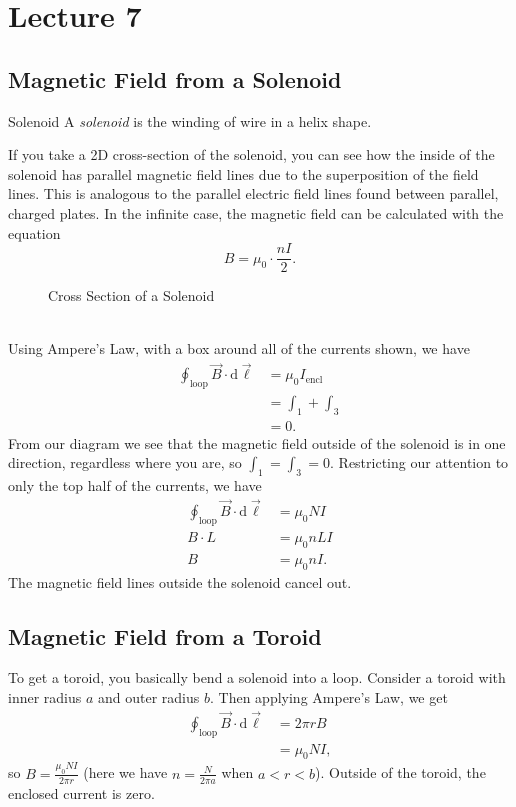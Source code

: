 \documentclass[class=article, crop=false]{standalone}
\begin{document}
  \section{Lecture 7}
  \subsection{Magnetic Field from a Solenoid}
  \begin{definition}{Solenoid}
    A \emph{solenoid} is the winding of wire in a helix shape.
  \end{definition}
  If you take a 2D cross-section of the solenoid, you can see how the inside of the solenoid has parallel magnetic field lines due to the superposition of the field lines. This is analogous to the parallel electric field lines found between parallel, charged plates. In the infinite case, the magnetic field can be calculated with the equation
  \[
    B = \mu_0\cdot \frac{nI}{2}.
  \]
  \begin{figure}[ht]
    \centering
    \caption{Cross Section of a Solenoid}
  \end{figure} \\
  Using Ampere's Law, with a box around all of the currents shown, we have
  \begin{align*}
    \oint_\text{loop} \vec{B}\cdot \mathrm{d}\vec{\ell} &= \mu_0I_\text{encl} \\
                                                        &= \int_1 + \int_3 \\
                                                        &= 0. \tag{The currents cancel}
  \end{align*}
  From our diagram we see that the magnetic field outside of the solenoid is in one direction, regardless where you are, so $\int_1 = \int_3 = 0$. Restricting our attention to only the top half of the currents, we have
  \begin{align*}
    \oint_\text{loop}\vec{B}\cdot \mathrm{d}\vec{\ell} &= \mu_0NI \\
    B\cdot L &= \mu_0nLI \\
    B &= \mu_0nI.
  \end{align*}
  The magnetic field lines outside the solenoid cancel out.
  \subsection{Magnetic Field from a Toroid}
  To get a toroid, you basically bend a solenoid into a loop. Consider a toroid with inner radius $a$ and outer radius $b$. Then applying Ampere's Law, we get
  \begin{align*}
    \oint_\text{loop}\vec{B}\cdot \mathrm{d}\vec{\ell} &= 2\pi rB \\
                                                       &= \mu_0NI,
  \end{align*}
  so $B = \frac{\mu_0NI}{2\pi r}$ (here we have $n = \frac{N}{2\pi a}$ when $a < r < b$). Outside of the toroid, the enclosed current is zero.
\end{document}
